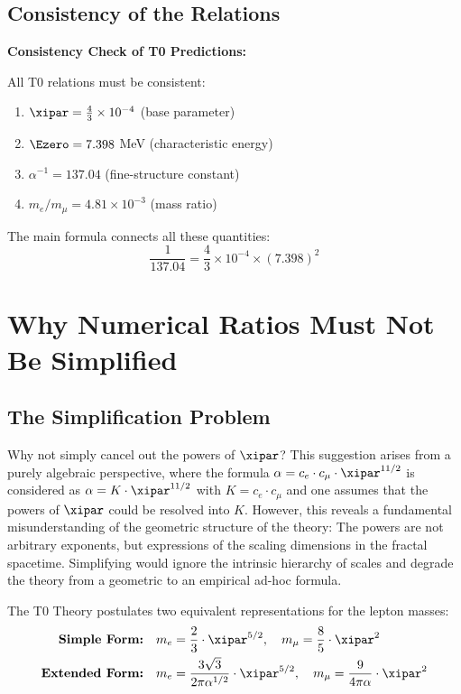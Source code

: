 	\subsection{Consistency of the Relations}
	
	\begin{keyresult}
		\textbf{Consistency Check of T0 Predictions:}
		
		All T0 relations must be consistent:
		\begin{enumerate}
			\item $\xipar = \frac{4}{3} \times 10^{-4}$ (base parameter)
			\item $\Ezero = 7.398$ MeV (characteristic energy)
			\item $\alpha^{-1} = 137.04$ (fine-structure constant)
			\item $m_e/m_\mu = 4.81 \times 10^{-3}$ (mass ratio)
		\end{enumerate}
		
		The main formula connects all these quantities:
		\begin{equation}
			\frac{1}{137.04} = \frac{4}{3} \times 10^{-4} \times (7.398)^2
		\end{equation}
	\end{keyresult}

	\section{Why Numerical Ratios Must Not Be Simplified}
	
	\subsection{The Simplification Problem}
	Why not simply cancel out the powers of $\xipar$? This suggestion arises from a purely algebraic perspective, where the formula $\alpha = c_e \cdot c_\mu \cdot \xipar^{11/2}$ is considered as $\alpha = K \cdot \xipar^{11/2}$ with $K = c_e \cdot c_\mu$ and one assumes that the powers of $\xipar$ could be resolved into $K$. However, this reveals a fundamental misunderstanding of the geometric structure of the theory: The powers are not arbitrary exponents, but expressions of the scaling dimensions in the fractal spacetime. Simplifying would ignore the intrinsic hierarchy of scales and degrade the theory from a geometric to an empirical ad-hoc formula.
	
	The T0 Theory postulates two equivalent representations for the lepton masses:
	\begin{align*}
		\textbf{Simple Form:} &\quad m_e = \frac{2}{3} \cdot \xipar^{5/2}, \quad m_\mu = \frac{8}{5} \cdot \xipar^2 \\
		\textbf{Extended Form:} &\quad m_e = \frac{3\sqrt{3}}{2\pi\alpha^{1/2}} \cdot \xipar^{5/2}, \quad m_\mu = \frac{9}{4\pi\alpha} \cdot \xipar^2
	\end{align*}
	
